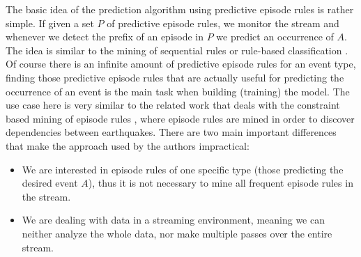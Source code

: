 The basic idea of the prediction algorithm using predictive episode rules is rather simple. If given a set $P$ of predictive episode rules, we monitor the stream and whenever we detect the prefix of an episode in $P$ we predict an occurrence of $A$. The idea is similar to the mining of sequential rules or rule-based classification \cite{ma1998integrating}.
Of course there is an infinite amount of predictive episode rules for an event type, finding those predictive episode rules that are actually useful for predicting the occurrence of an event is the main task when building (training) the model. The use case here is very similar to the related work that deals with the constraint based mining of episode rules \cite{meger2004constraint}, where episode rules are mined in order to discover dependencies between earthquakes. There are two main important differences that make the approach used by the authors impractical:

\begin{itemize}
 \item We are interested in episode rules of one specific type (those predicting the desired event $A$), thus it is not necessary to mine all frequent episode rules in the stream.
 \item We are dealing with data in a streaming environment, meaning we can neither analyze the whole data, nor make multiple passes over the entire stream.
\end{itemize}

